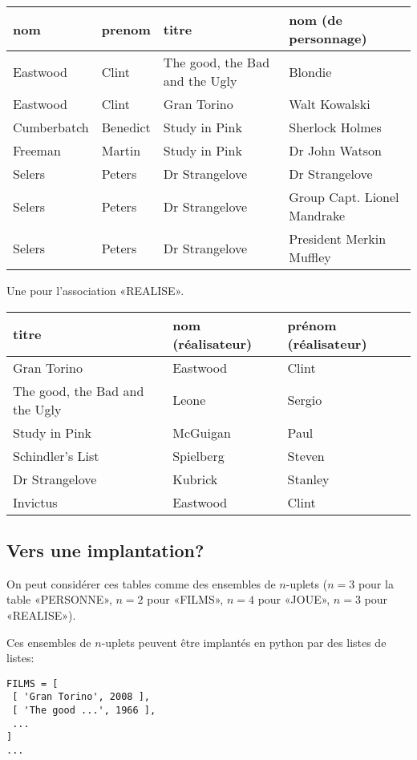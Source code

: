 \begin{center}
  \begin{tabular}{llll}
    \toprule
    nom & prenom & titre & nom (de personnage)\\
    \midrule
    Eastwood & Clint & {\small The good, the Bad and the Ugly}& Blondie\\
    Eastwood & Clint & Gran Torino& Walt Kowalski\\
    Cumberbatch&Benedict&Study in Pink& Sherlock Holmes\\
    Freeman & Martin&Study in Pink&Dr John Watson\\
    Selers & Peters&Dr Strangelove&Dr Strangelove\\
    Selers & Peters&Dr Strangelove&{\small Group Capt. Lionel Mandrake}\\
    Selers & Peters&Dr Strangelove&{\small President Merkin Muffley}\\
\bottomrule
  \end{tabular}
\end{center}
Une pour l'association «REALISE».
\begin{center}
\begin{tabular}{lll}
\toprule
  titre & nom (réalisateur)&prénom (réalisateur)\\
\midrule
  Gran Torino & Eastwood&Clint\\
  { The good, the Bad and the Ugly}&Leone&Sergio\\
  Study in Pink &  McGuigan & Paul\\
  Schindler's List& Spielberg&Steven\\
  Dr Strangelove& Kubrick&Stanley\\
  Invictus & Eastwood&Clint\\
\bottomrule
\end{tabular}
\end{center}

\subsection{Vers une implantation?}

On peut considérer ces tables comme des ensembles de $n$-uplets ($n=3$
pour la table «PERSONNE», $n=2$ pour «FILMS», $n=4$ pour «JOUE», $n=3$
pour «REALISE»).

Ces ensembles de $n$-uplets peuvent être implantés en python par des
listes de listes:

\begin{lstlisting}
FILMS = [
 [ 'Gran Torino', 2008 ],
 [ 'The good ...', 1966 ],
 ...
]
...
\end{lstlisting}

